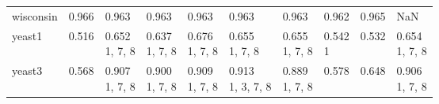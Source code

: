 \begin{tabular}{llllllllll}
wisconsin              &      \makecell{0.966 \\ \scriptsize{}} &               \makecell{0.963 \\ \scriptsize{}} &         \makecell{0.963 \\ \scriptsize{}} &               \makecell{0.963 \\ \scriptsize{}} &            \makecell{0.963 \\ \scriptsize{}} &               \makecell{0.963 \\ \scriptsize{}} &                  \makecell{0.962 \\ \scriptsize{}} &               \makecell{0.965 \\ \scriptsize{}} &                                                NaN \\
yeast1                 &      \makecell{0.516 \\ \scriptsize{}} &        \makecell{0.652 \\ \scriptsize{1, 7, 8}} &  \makecell{0.637 \\ \scriptsize{1, 7, 8}} &        \makecell{0.676 \\ \scriptsize{1, 7, 8}} &     \makecell{0.655 \\ \scriptsize{1, 7, 8}} &        \makecell{0.655 \\ \scriptsize{1, 7, 8}} &                 \makecell{0.542 \\ \scriptsize{1}} &               \makecell{0.532 \\ \scriptsize{}} &           \makecell{0.654 \\ \scriptsize{1, 7, 8}} \\
yeast3                 &      \makecell{0.568 \\ \scriptsize{}} &        \makecell{0.907 \\ \scriptsize{1, 7, 8}} &  \makecell{0.900 \\ \scriptsize{1, 7, 8}} &        \makecell{0.909 \\ \scriptsize{1, 7, 8}} &  \makecell{0.913 \\ \scriptsize{1, 3, 7, 8}} &        \makecell{0.889 \\ \scriptsize{1, 7, 8}} &                  \makecell{0.578 \\ \scriptsize{}} &               \makecell{0.648 \\ \scriptsize{}} &           \makecell{0.906 \\ \scriptsize{1, 7, 8}} \\
\bottomrule
\end{tabular}

